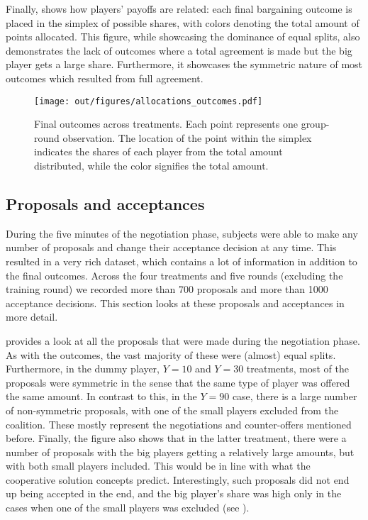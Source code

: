 Finally,  shows how players' payoffs are related: each final bargaining outcome is placed in the simplex of possible shares, with colors denoting the total amount of points allocated. This figure, while showcasing the dominance of equal splits, also demonstrates the lack of outcomes where a total agreement is made but the big player gets a large share. Furthermore, it showcases the symmetric nature of most outcomes which resulted from full agreement.

\begin{figure}
    \centering
    \texttt{[image: out/figures/allocations\_outcomes.pdf]}
    \caption{Final outcomes across treatments. Each point represents one group-round observation. The location of the point within the simplex indicates the shares of each player from the total amount distributed, while the color signifies the total amount.}
    \label{fig:allocations_outcomes}
\end{figure}


\subsection{Proposals and acceptances}

During the five minutes of the negotiation phase, subjects were able to make any number of proposals and change their acceptance decision at any time. This resulted in a very rich dataset, which contains a lot of information in addition to the final outcomes. Across the four treatments and five rounds (excluding the training round) we recorded more than 700 proposals and more than 1000 acceptance decisions. This section looks at these proposals and acceptances in more detail.

 provides a look at all the proposals that were made during the negotiation phase. As with the outcomes, the vast majority of these were (almost) equal splits. Furthermore, in the dummy player, $Y=10$ and $Y=30$ treatments, most of the proposals were symmetric in the sense that the same type of player was offered the same amount. In contrast to this, in the $Y=90$ case, there is a large number of non-symmetric proposals, with one of the small players excluded from the coalition. These mostly represent the negotiations and counter-offers mentioned before. Finally, the figure also shows that in the latter treatment, there were a number of proposals with the big players getting a relatively large amounts, but with both small players included. This would be in line with what the cooperative solution concepts predict. Interestingly, such proposals did not end up being accepted in the end, and the big player's share was high only in the cases when one of the small players was excluded (see ).

